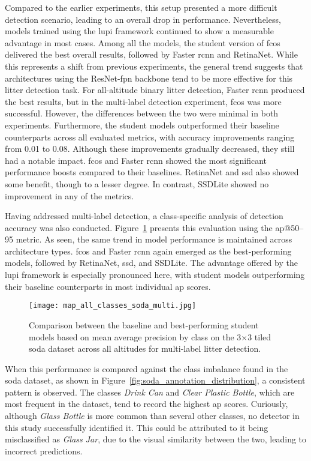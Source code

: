 Compared to the earlier experiments, this setup presented a more difficult detection scenario, leading to an overall drop in performance. Nevertheless, models trained using the \gls{lupi} framework continued to show a measurable advantage in most cases.
Among all the models, the student version of \gls{fcos} delivered the best overall results, followed by Faster \gls{rcnn} and RetinaNet. While this represents a shift from previous experiments, the general trend suggests that architectures using the ResNet-\gls{fpn} backbone tend to be more effective for this litter detection task. For all-altitude binary litter detection, Faster \gls{rcnn} produced the best results, but in the multi-label detection experiment, \gls{fcos} was more successful. However, the differences between the two were minimal in both experiments.
Furthermore, the student models outperformed their baseline counterparts across all evaluated metrics, with accuracy improvements ranging from 0.01 to 0.08. Although these improvements gradually decreased, they still had a notable impact. \gls{fcos} and Faster \gls{rcnn} showed the most significant performance boosts compared to their baselines. RetinaNet and \gls{ssd} also showed some benefit, though to a lesser degree. In contrast, SSDLite showed no improvement in any of the metrics.

Having addressed multi-label detection, a class-specific analysis of detection accuracy was also conducted. Figure~\ref{fig:soda_tiled_multi_per_class} presents this evaluation using the \gls{ap}@50--95 metric. As seen, the same trend in model performance is maintained across architecture types. \gls{fcos} and Faster \gls{rcnn} again emerged as the best-performing models, followed by RetinaNet, \gls{ssd}, and SSDLite. The advantage offered by the \gls{lupi} framework is especially pronounced here, with student models outperforming their baseline counterparts in most individual \gls{ap} scores.

\begin{figure}[!ht]
    \centering
    \texttt{[image: map\_all\_classes\_soda\_multi.jpg]}
    \caption{Comparison between the baseline and best-performing student models based on mean average precision by class on the 3$\times$3 tiled \gls{soda} dataset across all altitudes for multi-label litter detection.}
    \label{fig:soda_tiled_multi_per_class}
\end{figure}

When this performance is compared against the class imbalance found in the \gls{soda} dataset, as shown in Figure~\ref{fig:soda_annotation_distribution}, a consistent pattern is observed. The classes \textit{Drink Can} and \textit{Clear Plastic Bottle}, which are most frequent in the dataset, tend to record the highest \gls{ap} scores. Curiously, although \textit{Glass Bottle} is more common than several other classes, no detector in this study successfully identified it. This could be attributed to it being misclassified as \textit{Glass Jar}, due to the visual similarity between the two, leading to incorrect predictions.

